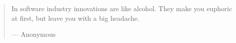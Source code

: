 \documentclass[12pt,a4paper]{article}
\begin{document}

\tableofcontents
\begin{quote}
In software industry innovations are like alcohol. They make you
euphoric at first, but leave you with a big headache.

--- Anonymous
\end{quote}






\end{document}
